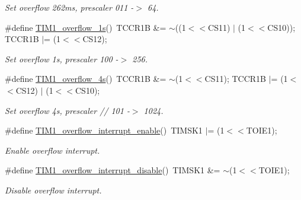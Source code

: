 \begin{DoxyCompactItemize}
\begin{DoxyCompactList}\small\item\em Set overflow 262ms, prescaler 011 -\/$>$ 64. \end{DoxyCompactList}\item 
\#define \hyperlink{a00013_ga36d54e146587c408a2ce92dfcd2c52c3}{T\+I\+M1\+\_\+overflow\+\_\+1s}()~T\+C\+C\+R1B \&= $\sim$((1$<$$<$C\+S11) $\vert$ (1$<$$<$C\+S10)); T\+C\+C\+R1B $\vert$= (1$<$$<$C\+S12);\hypertarget{a00013_ga36d54e146587c408a2ce92dfcd2c52c3}{}\label{a00013_ga36d54e146587c408a2ce92dfcd2c52c3}

\begin{DoxyCompactList}\small\item\em Set overflow 1s, prescaler 100 -\/$>$ 256. \end{DoxyCompactList}\item 
\#define \hyperlink{a00013_gac1fab4593fb6fa4dd8239431180343f3}{T\+I\+M1\+\_\+overflow\+\_\+4s}()~T\+C\+C\+R1B \&= $\sim$(1$<$$<$C\+S11); T\+C\+C\+R1B $\vert$= (1$<$$<$C\+S12) $\vert$ (1$<$$<$C\+S10);\hypertarget{a00013_gac1fab4593fb6fa4dd8239431180343f3}{}\label{a00013_gac1fab4593fb6fa4dd8239431180343f3}

\begin{DoxyCompactList}\small\item\em Set overflow 4s, prescaler // 101 -\/$>$ 1024. \end{DoxyCompactList}\item 
\#define \hyperlink{a00013_gad43aa0fc3eb8c3bd21ef2d4546130f05}{T\+I\+M1\+\_\+overflow\+\_\+interrupt\+\_\+enable}()~T\+I\+M\+S\+K1 $\vert$= (1$<$$<$T\+O\+I\+E1);\hypertarget{a00013_gad43aa0fc3eb8c3bd21ef2d4546130f05}{}\label{a00013_gad43aa0fc3eb8c3bd21ef2d4546130f05}

\begin{DoxyCompactList}\small\item\em Enable overflow interrupt. \end{DoxyCompactList}\item 
\#define \hyperlink{a00013_ga650fbf1dbe4572e36196a71982dbd061}{T\+I\+M1\+\_\+overflow\+\_\+interrupt\+\_\+disable}()~T\+I\+M\+S\+K1 \&= $\sim$(1$<$$<$T\+O\+I\+E1);\hypertarget{a00013_ga650fbf1dbe4572e36196a71982dbd061}{}\label{a00013_ga650fbf1dbe4572e36196a71982dbd061}

\begin{DoxyCompactList}\small\item\em Disable overflow interrupt. \end{DoxyCompactList}\end{DoxyCompactItemize}


